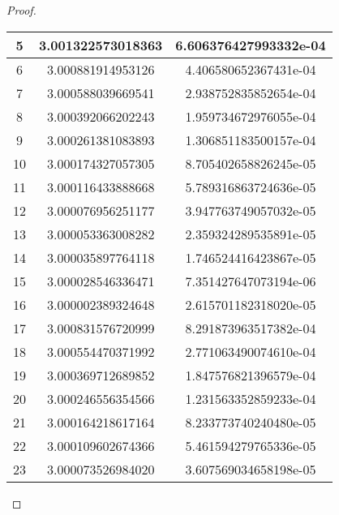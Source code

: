 \begin{enumerate}
\begin{proof}
\begin{table}[H]
\begin{subtable}[t]{.8\textwidth}
\begin{table}[H]
\begin{subtable}[t]{.8\textwidth}
\begin{table}[htbp]
\begin{subtable}[t]{.49\linewidth}
\begin{tabular}{|c|c|c|}
			\footnotesize	5	&	\footnotesize	3.001322573018363	&	\footnotesize	6.606376427993332e-04	\\	\hline
			\footnotesize	6	&	\footnotesize	3.000881914953126	&	\footnotesize	4.406580652367431e-04	\\	\hline
			\footnotesize	7	&	\footnotesize	3.000588039669541	&	\footnotesize	2.938752835852654e-04	\\	\hline
			\footnotesize	8	&	\footnotesize	3.000392066202243	&	\footnotesize	1.959734672976055e-04	\\	\hline
			\footnotesize	9	&	\footnotesize	3.000261381083893	&	\footnotesize	1.306851183500157e-04	\\	\hline
			\footnotesize	10	&	\footnotesize	3.000174327057305	&	\footnotesize	8.705402658826245e-05	\\	\hline
			\footnotesize	11	&	\footnotesize	3.000116433888668	&	\footnotesize	5.789316863724636e-05	\\	\hline
			\footnotesize	12	&	\footnotesize	3.000076956251177	&	\footnotesize	3.947763749057032e-05	\\	\hline
			\footnotesize	13	&	\footnotesize	3.000053363008282	&	\footnotesize	2.359324289535891e-05	\\	\hline
			\footnotesize	14	&	\footnotesize	3.000035897764118	&	\footnotesize	1.746524416423867e-05	\\	\hline
			\footnotesize	15	&	\footnotesize	3.000028546336471	&	\footnotesize	7.351427647073194e-06	\\	\hline
			\footnotesize	16	&	\footnotesize	3.000002389324648	&	\footnotesize	2.615701182318020e-05	\\	\hline
			\footnotesize	17	&	\footnotesize	3.000831576720999	&	\footnotesize	8.291873963517382e-04	\\	\hline
			\footnotesize	18	&	\footnotesize	3.000554470371992	&	\footnotesize	2.771063490074610e-04	\\	\hline
			\footnotesize	19	&	\footnotesize	3.000369712689852	&	\footnotesize	1.847576821396579e-04	\\	\hline
			\footnotesize	20	&	\footnotesize	3.000246556354566	&	\footnotesize	1.231563352859233e-04	\\	\hline
			\footnotesize	21	&	\footnotesize	3.000164218617164	&	\footnotesize	8.233773740240480e-05	\\	\hline
			\footnotesize	22	&	\footnotesize	3.000109602674366	&	\footnotesize	5.461594279765336e-05	\\	\hline
			\footnotesize	23	&	\footnotesize	3.000073526984020	&	\footnotesize	3.607569034658198e-05	\\	\hline

\end{tabular}
\end{subtable}
\end{table}
\end{subtable}
\end{table}
\end{subtable}
\end{table}
\end{proof}
\end{enumerate}
